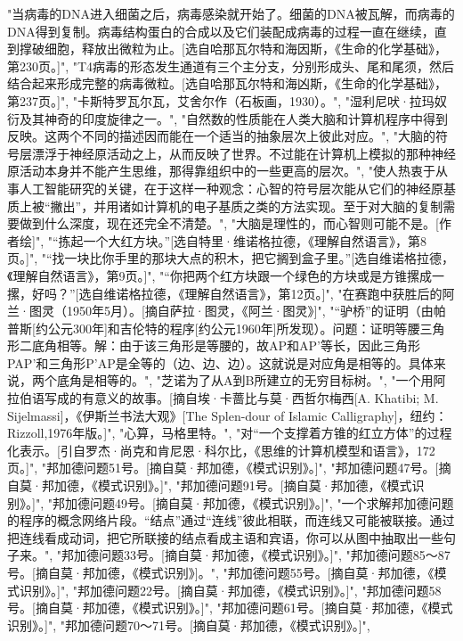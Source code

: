 "当病毒的DNA进入细菌之后，病毒感染就开始了。细菌的DNA被瓦解，而病毒的DNA得到复制。病毒结构蛋白的合成以及它们装配成病毒的过程一直在继续，直到撑破细胞，释放出微粒为止。[选自哈那瓦尔特和海因斯，《生命的化学基础》，第230页。]",
"T4病毒的形态发生通道有三个主分支，分别形成头、尾和尾须，然后结合起来形成完整的病毒微粒。[选自哈那瓦尔特和海凶斯，《生命的化学基础》，第237页。]",
"卡斯特罗瓦尔瓦，艾舍尔作（石板画，1930）。",
"湿利尼吠·拉玛奴衍及其神奇的印度旋律之一。",
"自然数的性质能在人类大脑和计算机程序中得到反映。这两个不同的描述因而能在一个适当的抽象层次上彼此对应。",
"大脑的符号层漂浮于神经原活动之上，从而反映了世界。不过能在计算机上模拟的那种神经原活动本身并不能产生思维，那得靠组织中的一些更高的层次。",
"使人热衷于从事人工智能研究的关键，在于这样一种观念：心智的符号层次能从它们的神经原基质上被“撇出''，并用诸如计算机的电子基质之类的方法实现。至于对大脑的复制需要做到什么深度，现在还完全不清楚。",
"大脑是理性的，而心智则可能不是。[作者绘]",
"“拣起一个大红方块。”[选自特里·维诺格拉德，《理解自然语言》，第8页。]",
"“找一块比你手里的那块大点的积木，把它搁到盒子里。”[选自维诺格拉德，《理解自然语言》，第9页。]",
"“你把两个红方块跟一个绿色的方块或是方锥摞成一摞，好吗？”[选自维诺格拉德，《理解自然语言》，第12页。]",
"在赛跑中获胜后的阿兰·图灵（1950年5月）。[摘自萨拉·图灵，《阿兰·图灵》]",
"“驴桥”的证明（由帕普斯[约公元300年]和吉伦特的程序[约公元1960年]所发现）。问题：证明等腰三角形二底角相等。解：由于该三角形是等腰的，故AP和AP'等长，因此三角形PAP'和三角形P'AP是全等的（边、边、边）。这就说是对应角是相等的。具体来说，两个底角是相等的。",
"芝诺为了从A到B所建立的无穷目标树。",
"一个用阿拉伯语写成的有意义的故事。[摘自埃·卡蔷比与莫·西哲尔梅西[A. Khatibi; M. Sijelmassi]，《伊斯兰书法大观》[The Splen-dour of Islamic Calligraphy]，纽约：Rizzoll,1976年版。]",
"心算，马格里特。",
"对“一个支撑着方锥的红立方体”的过程化表示。[引自罗杰·尚克和肯尼恩·科尔比，《思维的计算机模型和语言》，172页。]",
"邦加德问题51号。[摘自莫·邦加德，《模式识别》。]",
"邦加德问题47号。[摘自莫·邦加德，《模式识别》。]",
"邦加德问题91号。[摘自莫·邦加德，《模式识别》。]",
"邦加德问题49号。[摘自莫·邦加德，《模式识别》。]",
"一个求解邦加德问题的程序的概念网络片段。“结点”通过“连线”彼此相联，而连线又可能被联接。通过把连线看成动词，把它所联接的结点看成主语和宾语，你可以从图中抽取出一些句子来。",
"邦加德问题33号。[摘自莫·邦加德，《模式识别》。]",
"邦加德问题85～87号。[摘自莫·邦加德，《模式识别》]。",
"邦加德问题55号。[摘自莫·邦加德，《模式识别》。]",
"邦加德问题22号。[摘自莫·邦加德，《模式识别》。]",
"邦加德问题58号。[摘自莫·邦加德，《模式识别》。]",
"邦加德问题61号。[摘自莫·邦加德，《模式识别》。]",
"邦加德问题70～71号。[摘自莫·邦加德，《模式识别》。]",
